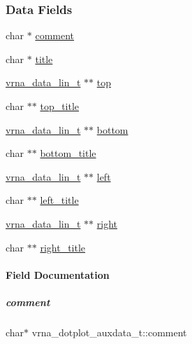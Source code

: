 \subsubsection*{Data Fields}
\begin{DoxyCompactItemize}
\item 
char $\ast$ \mbox{\hyperlink{group__plotting__utils_a244ff5044623adbb46db61f89a812f4c}{comment}}
\item 
char $\ast$ \mbox{\hyperlink{group__plotting__utils_a651c8b62c91f07056a2018219f9e3834}{title}}
\item 
\mbox{\hyperlink{group__data__structures_gaab843d6cdafd5433e3f6fa3b834d12f9}{vrna\+\_\+data\+\_\+lin\+\_\+t}} $\ast$$\ast$ \mbox{\hyperlink{group__plotting__utils_a5834cd1f871a38c76c91560679864a44}{top}}
\item 
char $\ast$$\ast$ \mbox{\hyperlink{group__plotting__utils_a9614c3ff559137f289d318b5a90bab05}{top\+\_\+title}}
\item 
\mbox{\hyperlink{group__data__structures_gaab843d6cdafd5433e3f6fa3b834d12f9}{vrna\+\_\+data\+\_\+lin\+\_\+t}} $\ast$$\ast$ \mbox{\hyperlink{group__plotting__utils_a60035f57164299f6f164d6c7a4dcfd08}{bottom}}
\item 
char $\ast$$\ast$ \mbox{\hyperlink{group__plotting__utils_a0afcf35613891c523b9934c563fe4ede}{bottom\+\_\+title}}
\item 
\mbox{\hyperlink{group__data__structures_gaab843d6cdafd5433e3f6fa3b834d12f9}{vrna\+\_\+data\+\_\+lin\+\_\+t}} $\ast$$\ast$ \mbox{\hyperlink{group__plotting__utils_a249418dc916bf2609186240c86dd3f66}{left}}
\item 
char $\ast$$\ast$ \mbox{\hyperlink{group__plotting__utils_a69c277c5aae30fae6454933ee29a8123}{left\+\_\+title}}
\item 
\mbox{\hyperlink{group__data__structures_gaab843d6cdafd5433e3f6fa3b834d12f9}{vrna\+\_\+data\+\_\+lin\+\_\+t}} $\ast$$\ast$ \mbox{\hyperlink{group__plotting__utils_aa22630b90143fb534cd68301cb852095}{right}}
\item 
char $\ast$$\ast$ \mbox{\hyperlink{group__plotting__utils_acb6f56b185c7c27573ea4a2dfcc15f4d}{right\+\_\+title}}
\end{DoxyCompactItemize}


\paragraph{Field Documentation}
\mbox{\label{group__plotting__utils_a244ff5044623adbb46db61f89a812f4c}} 
\subparagraph{\texorpdfstring{comment}{comment}}
{\footnotesize\ttfamily char$\ast$ vrna\+\_\+dotplot\+\_\+auxdata\+\_\+t\+::comment}

